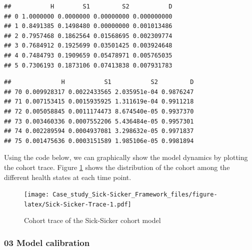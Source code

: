\documentclass[]{article}
\newenvironment{Shaded}{\begin{snugshade}}{\end{snugshade}}
\newcommand{\KeywordTok}[1]{\textcolor[rgb]{0.13,0.29,0.53}{\textbf{#1}}}
\newcommand{\CommentTok}[1]{\textcolor[rgb]{0.56,0.35,0.01}{\textit{#1}}}
\newcommand{\OperatorTok}[1]{\textcolor[rgb]{0.81,0.36,0.00}{\textbf{#1}}}
\newcommand{\NormalTok}[1]{#1}
\begin{document}
\begin{Shaded}
\end{Shaded}

\begin{verbatim}
##           H        S1         S2           D
## 0 1.0000000 0.0000000 0.00000000 0.000000000
## 1 0.8491385 0.1498480 0.00000000 0.001013486
## 2 0.7957468 0.1862564 0.01568695 0.002309774
## 3 0.7684912 0.1925699 0.03501425 0.003924648
## 4 0.7484793 0.1909659 0.05478971 0.005765035
## 5 0.7306193 0.1873106 0.07413838 0.007931783
\end{verbatim}

\begin{Shaded}
\end{Shaded}

\begin{verbatim}
##              H           S1           S2         D
## 70 0.009928317 0.0022433565 2.035951e-04 0.9876247
## 71 0.007153415 0.0015935925 1.311619e-04 0.9911218
## 72 0.005058845 0.0011174473 8.674540e-05 0.9937370
## 73 0.003460336 0.0007552206 5.436484e-05 0.9957301
## 74 0.002289594 0.0004937081 3.298632e-05 0.9971837
## 75 0.001475636 0.0003151589 1.985106e-05 0.9981894
\end{verbatim}

Using the code below, we can graphically show the model dynamics by
plotting the cohort trace. Figure \ref{fig:Sick-Sicker-Trace} shows the
distribution of the cohort among the different health states at each
time point.

\begin{figure}
\centering
\texttt{[image: Case\_study\_Sick-Sicker\_Framework\_files/figure-latex/Sick-Sicker-Trace-1.pdf]}
\caption{Cohort trace of the Sick-Sicker cohort
model\label{fig:Sick-Sicker-Trace}}
\end{figure}

\subsubsection{03 Model calibration}\label{model-calibration}
\end{document}
